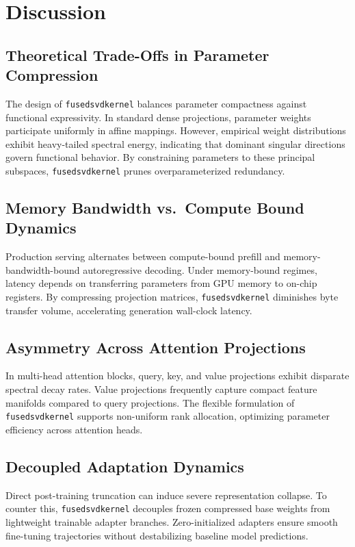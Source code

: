 \section{Discussion}

\subsection{Theoretical Trade-Offs in Parameter Compression}
The design of \texttt{fusedsvdkernel} balances parameter compactness against functional expressivity. In standard dense projections, parameter weights participate uniformly in affine mappings. However, empirical weight distributions exhibit heavy-tailed spectral energy, indicating that dominant singular directions govern functional behavior. By constraining parameters to these principal subspaces, \texttt{fusedsvdkernel} prunes overparameterized redundancy.

\subsection{Memory Bandwidth vs.\ Compute Bound Dynamics}
Production serving alternates between compute-bound prefill and memory-bandwidth-bound autoregressive decoding. Under memory-bound regimes, latency depends on transferring parameters from GPU memory to on-chip registers. By compressing projection matrices, \texttt{fusedsvdkernel} diminishes byte transfer volume, accelerating generation wall-clock latency.

\subsection{Asymmetry Across Attention Projections}
In multi-head attention blocks, query, key, and value projections exhibit disparate spectral decay rates. Value projections frequently capture compact feature manifolds compared to query projections. The flexible formulation of \texttt{fusedsvdkernel} supports non-uniform rank allocation, optimizing parameter efficiency across attention heads.

\subsection{Decoupled Adaptation Dynamics}
Direct post-training truncation can induce severe representation collapse. To counter this, \texttt{fusedsvdkernel} decouples frozen compressed base weights from lightweight trainable adapter branches. Zero-initialized adapters ensure smooth fine-tuning trajectories without destabilizing baseline model predictions.

